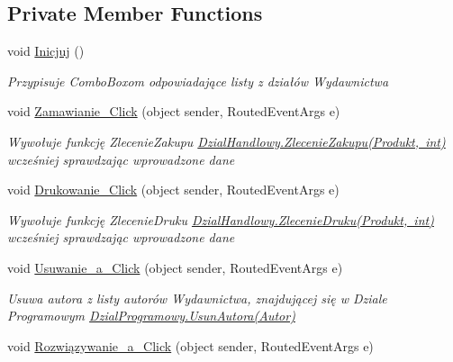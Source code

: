 \subsection*{Private Member Functions}
\begin{DoxyCompactItemize}
\item 
void \mbox{\hyperlink{class_projekt1_1_1_main_window_afdda85a4d4f8eaa2014fdf0bc313af58}{Inicjuj}} ()
\begin{DoxyCompactList}\small\item\em Przypisuje Combo\+Boxom odpowiadające listy z działów Wydawnictwa \end{DoxyCompactList}\item 
void \mbox{\hyperlink{class_projekt1_1_1_main_window_a9891b3bd97907aab93904768d2ce1156}{Zamawianie\+\_\+\+Click}} (object sender, Routed\+Event\+Args e)
\begin{DoxyCompactList}\small\item\em Wywołuje funkcję Zlecenie\+Zakupu \mbox{\hyperlink{class_projekt1_1_1_dzial_handlowy_acd312cb8369482f492936c642ef5170f}{Dzial\+Handlowy.\+Zlecenie\+Zakupu(\+Produkt, int)}} wcześniej sprawdzając wprowadzone dane \end{DoxyCompactList}\item 
void \mbox{\hyperlink{class_projekt1_1_1_main_window_a263e416fd6908e2f47dc0b7fb64cc269}{Drukowanie\+\_\+\+Click}} (object sender, Routed\+Event\+Args e)
\begin{DoxyCompactList}\small\item\em Wywołuje funkcję Zlecenie\+Druku \mbox{\hyperlink{class_projekt1_1_1_dzial_handlowy_a42c78f53cf41e75b39498a7da96e7bc3}{Dzial\+Handlowy.\+Zlecenie\+Druku(\+Produkt, int)}} wcześniej sprawdzając wprowadzone dane \end{DoxyCompactList}\item 
void \mbox{\hyperlink{class_projekt1_1_1_main_window_a6e6eb27feb99681157ce530ad2d22042}{Usuwanie\+\_\+a\+\_\+\+Click}} (object sender, Routed\+Event\+Args e)
\begin{DoxyCompactList}\small\item\em Usuwa autora z listy autorów Wydawnictwa, znajdującej się w Dziale Programowym \mbox{\hyperlink{class_projekt1_1_1_dzial_programowy_abb3d14c312ae10ce95b8b7800b6a7a78}{Dzial\+Programowy.\+Usun\+Autora(\+Autor)}} \end{DoxyCompactList}\item 
void \mbox{\hyperlink{class_projekt1_1_1_main_window_a90f50a8cc16ea210ea79ccb7643dee0b}{Rozwiązywanie\+\_\+a\+\_\+\+Click}} (object sender, Routed\+Event\+Args e)

\end{DoxyCompactItemize}
